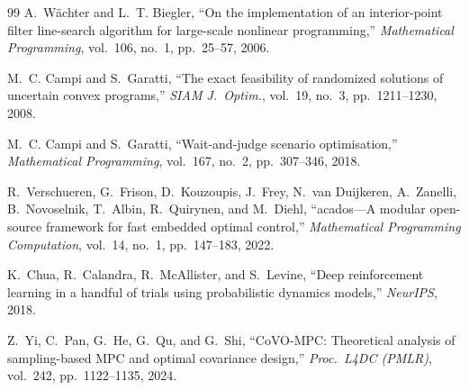 \documentclass[11pt,onecolumn,a4paper]{article}
\begin{document}
\begin{thebibliography}{99}
A.~W{\"a}chter and L.~T. Biegler, ``On the implementation of an
interior-point filter line-search algorithm for large-scale nonlinear
programming,'' \emph{Mathematical Programming}, vol.~106, no.~1,
pp.~25--57, 2006.

M.~C. Campi and S.~Garatti, ``The exact feasibility of randomized
solutions of uncertain convex programs,'' \emph{SIAM J.\ Optim.},
vol.~19, no.~3, pp.~1211--1230, 2008.

M.~C. Campi and S.~Garatti, ``Wait-and-judge scenario optimisation,''
\emph{Mathematical Programming}, vol.~167, no.~2, pp.~307--346, 2018.

R.~Verschueren, G.~Frison, D.~Kouzoupis, J.~Frey, N.~van Duijkeren,
A.~Zanelli, B.~Novoselnik, T.~Albin, R.~Quirynen, and M.~Diehl,
``acados---A modular open-source framework for fast embedded optimal
control,'' \emph{Mathematical Programming Computation}, vol.~14,
no.~1, pp.~147--183, 2022.

K.~Chua, R.~Calandra, R.~McAllister, and S.~Levine, ``Deep reinforcement
learning in a handful of trials using probabilistic dynamics models,''
\emph{NeurIPS}, 2018.

Z.~Yi, C.~Pan, G.~He, G.~Qu, and G.~Shi, ``CoVO-MPC: Theoretical
analysis of sampling-based MPC and optimal covariance design,''
\emph{Proc.\ L4DC (PMLR)}, vol.~242, pp.~1122--1135, 2024.

\end{thebibliography}

\end{document}
